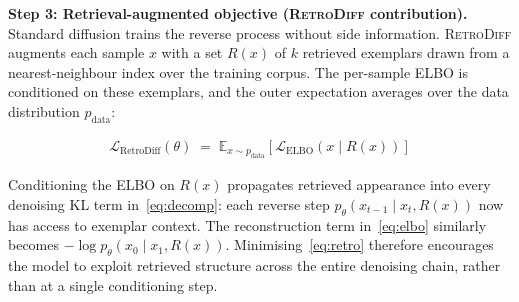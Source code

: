 \documentclass[11pt]{article}
\newcommand{\method}{\textsc{RetroDiff}\xspace}
\newcommand{\Lelbo}{\mathcal{L}_{\mathrm{ELBO}}}
\newcommand{\Lretro}{\mathcal{L}_{\mathrm{RetroDiff}}}
\newcommand{\Ret}{R(x)}
\newcommand{\ptheta}{p_\theta}
\newcommand{\Eq}[1]{\mathbb{E}_{#1}}
\begin{document}
\medskip
\noindent\textbf{Step 3: Retrieval-augmented objective (\method contribution).}
Standard diffusion trains the reverse process without side information.
\method augments each sample $x$ with a set $\Ret$ of $k$ retrieved exemplars drawn from a
nearest-neighbour index over the training corpus.  The per-sample ELBO is conditioned on
these exemplars, and the outer expectation averages over the data distribution
$p_{\mathrm{data}}$:

\begin{align}
  \Lretro(\theta)
  \;=\;
  \Eq{x \sim p_{\mathrm{data}}}\!\left[
      \Lelbo\!\left(x \;\big|\; \Ret\right)
  \right]
  \label{eq:retro}
\end{align}

\noindent
Conditioning the ELBO on $\Ret$ propagates retrieved appearance into every denoising KL
term in~\eqref{eq:decomp}: each reverse step $\ptheta(x_{t-1}\mid x_t, \Ret)$ now has
access to exemplar context.  The reconstruction term in~\eqref{eq:elbo} similarly becomes
$-\log\ptheta(x_0\mid x_1, \Ret)$.  Minimising~\eqref{eq:retro} therefore encourages the
model to exploit retrieved structure across the entire denoising chain, rather than at a
single conditioning step.
\end{document}
